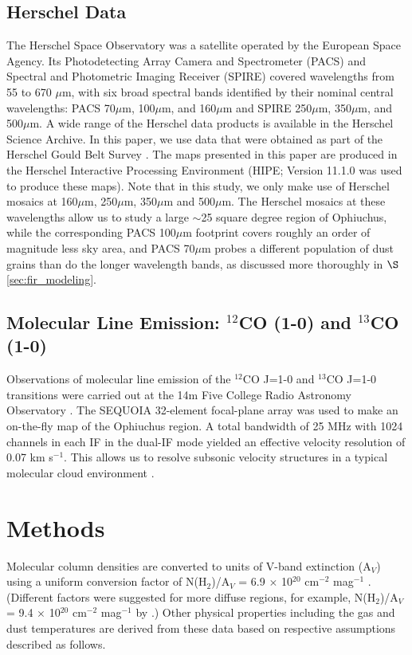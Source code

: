 \documentclass[11pt,a4paper]{emulateapj}
\begin{document}
\subsection{Herschel Data}
\label{sec:herschel_data}
The Herschel Space Observatory was a satellite operated by the European Space Agency. Its Photodetecting Array Camera and Spectrometer (PACS) and Spectral and Photometric Imaging Receiver (SPIRE) covered wavelengths from 55 to 670 $\mu$m, with six broad spectral bands identified by their nominal central wavelengths: PACS 70$\mu$m, 100$\mu$m, and 160$\mu$m and SPIRE 250$\mu$m, 350$\mu$m, and 500$\mu$m. A wide range of the Herschel data products is available in the Herschel Science Archive. In this paper, we use data that were obtained as part of the Herschel Gould Belt Survey \citep{Andre_2010}. The maps presented in this paper are produced in the Herschel Interactive Processing Environment (HIPE; Version 11.1.0 was used to produce these maps). Note that in this study, we only make use of Herschel mosaics at 160$\mu$m, 250$\mu$m, 350$\mu$m and 500$\mu$m. The Herschel mosaics at these wavelengths allow us to study a large $\sim$25 square degree region of Ophiuchus, while the  corresponding PACS 100$\mu$m footprint covers roughly an order of magnitude less sky area, and PACS 70$\mu$m probes a different population of dust grains than do the longer wavelength bands, as discussed more thoroughly in $\S$\ref{sec:fir_modeling}.

\subsection{Molecular Line Emission: $^{12}$CO (1-0) and $^{13}$CO (1-0)}
Observations of molecular line emission of the $^{12}$CO J=1-0 and $^{13}$CO J=1-0 transitions were carried out at the 14m Five College Radio Astronomy Observatory \citep[FCRAO;]{Ridge_2006}. The SEQUOIA 32-element focal-plane array was used to make an on-the-fly map of the Ophiuchus region. A total bandwidth of 25 MHz with 1024 channels in each IF in the dual-IF mode yielded an effective velocity resolution of 0.07 km s$^{-1}$. This allows us to resolve subsonic velocity structures in a typical molecular cloud environment \citep[with a temperature of 15 K and an average molecular weight of 2.33 m$_H$;]{Carey_1998,Pillai_2006}.

\section{Methods}
\label{sec:methods}
Molecular column densities are converted to units of V-band extinction (A$_V$) using a uniform conversion factor of N(H$_2$)/A$_V$ = 6.9 $\times$ 10$^{20}$ cm$^{-2}$ mag$^{-1}$ \citep{Draine_2003,Evans_2009}. (Different factors were suggested for more diffuse regions, for example, N(H$_2$)/A$_V$ = 9.4 $\times$ 10$^{20}$ cm$^{-2}$ mag$^{-1}$ by \citet{Bohlin_1978}.) Other physical properties including the gas and dust temperatures are derived from these data based on respective assumptions described as follows.
\end{document}
